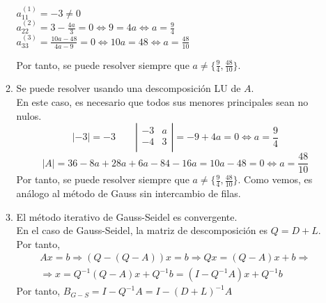 \documentclass[12pt]{article}
\begin{document}
\begin{ejercicio}
\begin{enumerate}
\begin{enumerate}
            $a_{11}^{(1)}=-3\neq 0$\\
            $a_{22}^{(2)}=3-\frac{4a}{3} = 0 \Longleftrightarrow 9=4a \Longleftrightarrow a=\frac{9}{4}$\\
            $a_{33}^{(3)}=\frac{10a-48}{4a-9} = 0 \Longleftrightarrow 10a=48 \Longleftrightarrow a=\frac{48}{10}$

            Por tanto, se puede resolver siempre que $a\neq \{\frac{9}{4}, \frac{48}{10}\}$.
            
            \item Se puede resolver usando una descomposición LU de $A$.\\

            En este caso, es necesario que todos sus menores principales sean no nulos.
            \begin{equation*}
                |-3|=-3 \qquad 
                \left| \begin{array}{cc}
                    -3 & a \\
                    -4 & 3 \\
                \end{array} \right| = -9+4a = 0 \Longleftrightarrow a=\frac{9}{4}
            \end{equation*}
            \begin{equation*}
                |A|=36 -8a +28a +6a -84-16a = 10a -48 = 0 \Longleftrightarrow a=\frac{48}{10}
            \end{equation*}
            Por tanto, se puede resolver siempre que $a\neq \{\frac{9}{4}, \frac{48}{10}\}$. Como vemos, es análogo al método de Gauss sin intercambio de filas.

            \item El método iterativo de Gauss-Seidel es convergente.\\

            En el caso de Gauss-Seidel, la matriz de descomposición es $Q=D+L$. Por tanto,
            \begin{multline*}
                Ax=b \Longrightarrow (Q-(Q-A))x=b \Longrightarrow Qx = (Q-A)x + b \Longrightarrow \\ \Longrightarrow x=Q^{-1}(Q-A)x + Q^{-1}b = (I-Q^{-1}A)x + Q^{-1}b
            \end{multline*}
            Por tanto, $B_{G-S} = I-Q^{-1}A = I-(D+L)^{-1}A$


\end{enumerate}
\end{enumerate}
\end{ejercicio}
\end{document}
